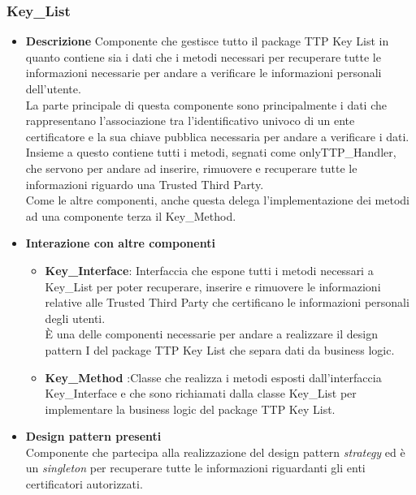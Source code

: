 \subsubsection{Key\_List}
\begin{itemize}
	\item \textbf{Descrizione}
	Componente che gestisce tutto il package TTP Key List in quanto contiene sia i dati che i metodi necessari per recuperare tutte le informazioni necessarie per andare a verificare le informazioni personali dell'utente.\\
	La parte principale di questa componente sono principalmente i dati che rappresentano l'associazione tra l'identificativo univoco di un ente certificatore e la sua chiave pubblica necessaria per andare a verificare i dati.\\
	Insieme a questo contiene tutti i metodi, segnati come onlyTTP\_Handler, che servono per andare ad inserire, rimuovere e recuperare tutte le informazioni riguardo una Trusted Third Party.\\
	Come le altre componenti, anche questa delega l'implementazione dei metodi ad una componente terza il Key\_Method.
	\item \textbf{Interazione con altre componenti}
	\begin{itemize}
		\item \textbf{Key\_Interface}: Interfaccia che espone tutti i metodi necessari a Key\_List per poter recuperare, inserire e rimuovere le informazioni relative alle Trusted Third Party che certificano le informazioni personali degli utenti.\\
		È una delle componenti necessarie per andare a realizzare il design pattern I del package TTP Key List che separa dati da business logic.
		\item \textbf{Key\_Method} :Classe che realizza i metodi esposti dall'interfaccia Key\_Interface e che sono richiamati dalla classe Key\_List per implementare la business logic del package TTP Key List.
	\end{itemize}
	\item \textbf{Design pattern presenti}\\
	Componente che partecipa alla realizzazione del design pattern \textit{strategy} ed è un \textit{singleton} per recuperare tutte le informazioni riguardanti gli enti certificatori autorizzati.
\end{itemize}

